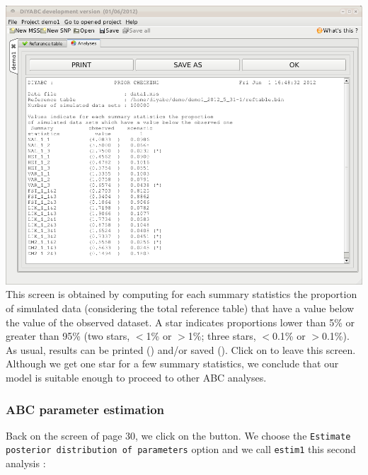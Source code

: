 \includegraphics[scale=0.35]{gui_pictures/Capture-DIYABC-33.png} \\

This screen is obtained by computing for each summary statistics the proportion of simulated data (considering the total reference table) that have a value below the value of the observed dataset. A star indicates proportions lower than 5\% or greater than 95\% (two stars, $<$1\% or $>$1\%; three stars, $<$0.1\% or $>$0.1\%).\\ 

 As usual, results can be printed () and/or saved (). Click on  to leave this screen.\\

Although we get one star for a few summary statistics, we conclude that our model is suitable enough to proceed to other ABC analyses.

\subsubsection{ABC parameter estimation}

Back on the screen of page 30, we click on the  button. We choose the \texttt{Estimate posterior distribution of parameters} option and we call \texttt{estim1} this second analysis :\\

